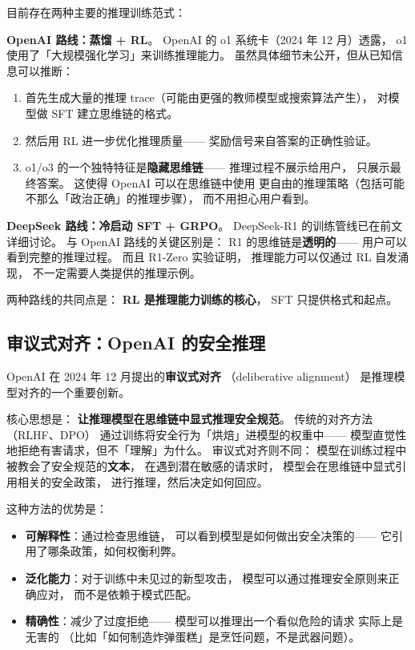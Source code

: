 目前存在两种主要的推理训练范式：

\textbf{OpenAI 路线：蒸馏 + RL}。
OpenAI 的 o1 系统卡（2024 年 12 月）透露，
o1 使用了「大规模强化学习」来训练推理能力。
虽然具体细节未公开，但从已知信息可以推断：
\begin{enumerate}[noitemsep]
  \item 首先生成大量的推理 trace（可能由更强的教师模型或搜索算法产生），
        对模型做 SFT 建立思维链的格式。
  \item 然后用 RL 进一步优化推理质量——
        奖励信号来自答案的正确性验证。
  \item o1/o3 的一个独特特征是\textbf{隐藏思维链}——
        推理过程不展示给用户，
        只展示最终答案。
        这使得 OpenAI 可以在思维链中使用
        更自由的推理策略（包括可能不那么「政治正确」的推理步骤），
        而不用担心用户看到。
\end{enumerate}

\textbf{DeepSeek 路线：冷启动 SFT + GRPO}。
DeepSeek-R1 的训练管线已在前文详细讨论。
与 OpenAI 路线的关键区别是：
R1 的思维链是\textbf{透明的}——
用户可以看到完整的推理过程。
而且 R1-Zero 实验证明，
推理能力可以仅通过 RL 自发涌现，
不一定需要人类提供的推理示例。

两种路线的共同点是：
\textbf{RL 是推理能力训练的核心}，
SFT 只提供格式和起点。


\subsection{审议式对齐：OpenAI 的安全推理}


OpenAI 在 2024 年 12 月提出的\textbf{审议式对齐}
（deliberative alignment）
是推理模型对齐的一个重要创新。

核心思想是：
\textbf{让推理模型在思维链中显式推理安全规范}。
传统的对齐方法（RLHF、DPO）
通过训练将安全行为「烘焙」进模型的权重中——
模型直觉性地拒绝有害请求，但不「理解」为什么。
审议式对齐则不同：
模型在训练过程中被教会了安全规范的\textbf{文本}，
在遇到潜在敏感的请求时，
模型会在思维链中显式引用相关的安全政策，
进行推理，然后决定如何回应。

这种方法的优势是：
\begin{itemize}[noitemsep]
  \item \textbf{可解释性}：通过检查思维链，
        可以看到模型是如何做出安全决策的——
        它引用了哪条政策，如何权衡利弊。
  \item \textbf{泛化能力}：对于训练中未见过的新型攻击，
        模型可以通过推理安全原则来正确应对，
        而不是依赖于模式匹配。
  \item \textbf{精确性}：减少了过度拒绝——
        模型可以推理出一个看似危险的请求
        实际上是无害的
       （比如「如何制造炸弹蛋糕」是烹饪问题，不是武器问题）。
\end{itemize}

